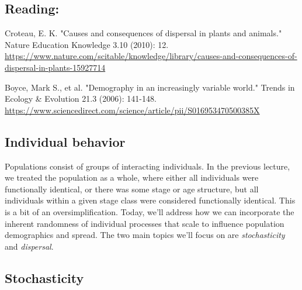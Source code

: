 \documentclass[12pt]{article}
\begin{document}
\subsection*{Reading:}

Croteau, E. K. "Causes and consequences of dispersal in plants and animals." Nature Education Knowledge 3.10 (2010): 12. \\ \url{https://www.nature.com/scitable/knowledge/library/causes-and-consequences-of-dispersal-in-plants-15927714} \\

\bigskip

Boyce, Mark S., et al. "Demography in an increasingly variable world." Trends in Ecology \& Evolution 21.3 (2006): 141-148. \\ \url{https://www.sciencedirect.com/science/article/pii/S016953470500385X}



















\begin{center}
\noindent\hrulefill 
\end{center}


\clearpage

\subsection*{Individual behavior}

Populations consist of groups of interacting individuals. In the previous lecture, we treated the population as a whole, where either all individuals were functionally identical, or there was some stage or age structure, but all individuals within a given stage class were considered functionally identical. This is a bit of an oversimplification. Today, we'll address how we can incorporate the inherent randomness of individual processes that scale to influence population demographics and spread. The two main topics we'll focus on are \textit{stochasticity} and \textit{dispersal}.






\clearpage

\subsection*{Stochasticity}
\end{document}

